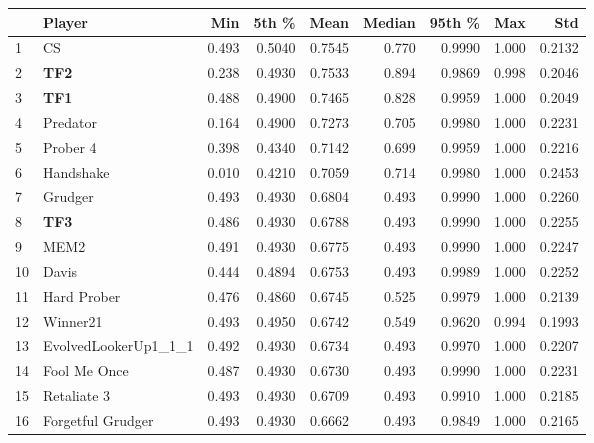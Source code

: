 \begin{tabular}{llrrrrrrr}
\toprule
{} &                Player &    Min &   5th \% &    Mean &  Median &  95th \% &    Max &     Std \\
\midrule
1  &                    CS &  0.493 &  0.5040 &  0.7545 &   0.770 &  0.9990 &  1.000 &  0.2132 \\
2  &                   \textbf{TF2} &  0.238 &  0.4930 &  0.7533 &   0.894 &  0.9869 &  0.998 &  0.2046 \\
3  &                   \textbf{TF1} &  0.488 &  0.4900 &  0.7465 &   0.828 &  0.9959 &  1.000 &  0.2049 \\
4  &              Predator &  0.164 &  0.4900 &  0.7273 &   0.705 &  0.9980 &  1.000 &  0.2231 \\
5  &              Prober 4 &  0.398 &  0.4340 &  0.7142 &   0.699 &  0.9959 &  1.000 &  0.2216 \\
6  &             Handshake &  0.010 &  0.4210 &  0.7059 &   0.714 &  0.9980 &  1.000 &  0.2453 \\
7  &               Grudger &  0.493 &  0.4930 &  0.6804 &   0.493 &  0.9990 &  1.000 &  0.2260 \\
8  &                   \textbf{TF3} &  0.486 &  0.4930 &  0.6788 &   0.493 &  0.9990 &  1.000 &  0.2255 \\
9  &                  MEM2 &  0.491 &  0.4930 &  0.6775 &   0.493 &  0.9990 &  1.000 &  0.2247 \\
10 &                 Davis &  0.444 &  0.4894 &  0.6753 &   0.493 &  0.9989 &  1.000 &  0.2252 \\
11 &           Hard Prober &  0.476 &  0.4860 &  0.6745 &   0.525 &  0.9979 &  1.000 &  0.2139 \\
12 &              Winner21 &  0.493 &  0.4950 &  0.6742 &   0.549 &  0.9620 &  0.994 &  0.1993 \\
13 &  EvolvedLookerUp1\_1\_1 &  0.492 &  0.4930 &  0.6734 &   0.493 &  0.9970 &  1.000 &  0.2207 \\
14 &          Fool Me Once &  0.487 &  0.4930 &  0.6730 &   0.493 &  0.9990 &  1.000 &  0.2231 \\
15 &           Retaliate 3 &  0.493 &  0.4930 &  0.6709 &   0.493 &  0.9910 &  1.000 &  0.2185 \\
16 &     Forgetful Grudger &  0.493 &  0.4930 &  0.6662 &   0.493 &  0.9849 &  1.000 &  0.2165 \\
\bottomrule
\end{tabular}
